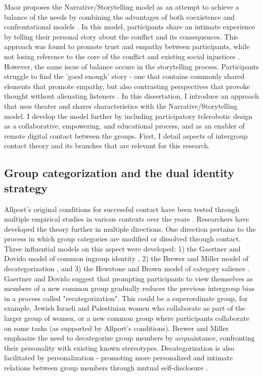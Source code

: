 \documentclass[dissertation,math,vertlayout,pdfa,colorlinks]{aaltoseries}
\begin{document}
Maoz proposes the Narrative/Storytelling model as an attempt to achieve a balance of the needs by combining the advantages of both coexistence and confrontational models \cite{maozDoesContactWork2011}. In this model, participants share an intimate experience by telling their personal story about the conflict and its consequences. This approach was found to promote trust and empathy between participants, while not losing reference to the core of the conflict and existing social injustices \cite{bar-onConciliationStorytellingVictimhood2002,bar-onTellYourLife2006,bar-onStorytellingWayWork2004}. However, the same issue of balance occurs in the storytelling process. Participants struggle to find the 'good enough' story - one that contains commonly shared elements that promote empathy, but also contrasting perspectives that provoke thought without alienating listeners \cite{bar-onTellYourLife2006}. In this dissertation, I introduce an approach that uses theater and shares characteristics with the Narrative/Storytelling model. I develop the model further by including participatory telerobotic design as a collaborative, empowering, and educational process, and as an enabler of remote digital contact between the groups. First, I detail aspects of intergroup contact theory and its branches that are relevant for this research.

\subsection{Group categorization and the dual identity strategy}
\label{sec:dual_identity}
Allport's original conditions for successful contact have been tested through multiple empirical studies in various contexts over the years \cite{pettigrewDoesIntergroupContact2013}. Researchers have developed the theory further in multiple directions. One direction pertains to the process in which group categories are modified or dissolved through contact. Three influential models on this aspect were developed: 1) the Gaertner and Dovido model of common ingroup identity \cite{gaertnerReducingIntergroupBias2000}, 2) the Brewer and Miller model of decategorization \cite{brewerContactHypothesisTheoretical1984}, and 3) the Hewstone and Brown model of category salience \cite{hewstoneContactNotEnough1986}. Gaertner and Dovido suggest that prompting participants to view themselves as members of a new common group gradually reduces the previous intergroup bias in a process called "recategorization". This could be a superordinate group, for example, Jewish Israeli and Palestinian women who collaborate as part of the larger group of women, or a new common group where participants collaborate on some tasks \cite{gaertnerCategorizationRecategorizationIntergroup2005} (as supported by Allport's conditions). Brewer and Miller emphasize the need to decategorize group members by acquaintance, confronting their personality with existing known stereotypes. Decategorization is also facilitated by personalization - promoting more personalized and intimate relations between group members through mutual self-disclosure \cite{millerPersonalizationPromiseContact2002}.
\end{document}
